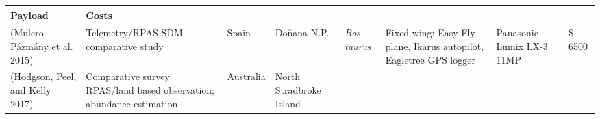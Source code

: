 \documentclass[]{interact}
\theoremstyle{plain}%
\theoremstyle{definition}
\theoremstyle{remark}
\begin{document}
\begin{longtable}[]{@{}llllllll@{}}
\begin{minipage}[b]{0.11\columnwidth}
Payload\strut
\end{minipage} & \begin{minipage}[b]{0.01\columnwidth}\raggedright\strut
Costs\strut
\end{minipage}\tabularnewline
\midrule
\endhead
\begin{minipage}[t]{0.11\columnwidth}\raggedright\strut
(Mulero-Pázmány et al. 2015)\strut
\end{minipage} & \begin{minipage}[t]{0.18\columnwidth}\raggedright\strut
Telemetry/RPAS SDM comparative study\strut
\end{minipage} & \begin{minipage}[t]{0.03\columnwidth}\raggedright\strut
Spain\strut
\end{minipage} & \begin{minipage}[t]{0.14\columnwidth}\raggedright\strut
Doñana N.P.\strut
\end{minipage} & \begin{minipage}[t]{0.10\columnwidth}\raggedright\strut
\emph{Bos taurus}\strut
\end{minipage} & \begin{minipage}[t]{0.09\columnwidth}\raggedright\strut
Fixed-wing: Easy Fly plane, Ikarus autopilot, Eagletree GPS logger\strut
\end{minipage} & \begin{minipage}[t]{0.11\columnwidth}\raggedright\strut
Panasonic Lumix LX-3 11MP\strut
\end{minipage} & \begin{minipage}[t]{0.01\columnwidth}\raggedright\strut
\$ 6500\strut
\end{minipage}\tabularnewline
\begin{minipage}[t]{0.11\columnwidth}\raggedright\strut
(Hodgson, Peel, and Kelly 2017)\strut
\end{minipage} & \begin{minipage}[t]{0.18\columnwidth}\raggedright\strut
Comparative survey RPAS/land based observation; abundance
estimation\strut
\end{minipage} & \begin{minipage}[t]{0.03\columnwidth}\raggedright\strut
Australia\strut
\end{minipage} & \begin{minipage}[t]{0.14\columnwidth}\raggedright\strut
North Stradbroke Island\strut
\end{minipage} & \begin{minipage}[t]{0.10\columnwidth}\raggedright\strut

\end{minipage}
\end{longtable}
\end{document}
